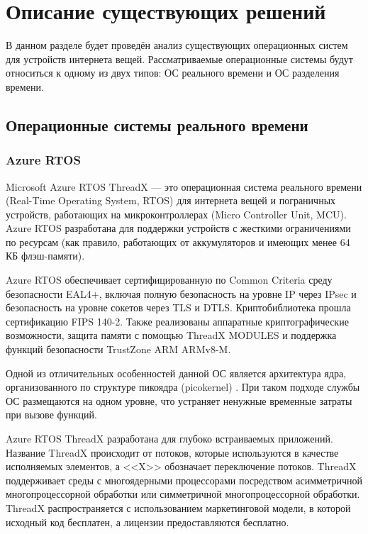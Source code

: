 \section{Описание существующих решений}

В данном разделе будет проведён анализ существующих операционных систем для устройств интернета вещей. Рассматриваемые операционные системы будут относиться к одному из двух типов: ОС реального времени и ОС разделения времени.

\subsection{Операционные системы реального времени}

\subsubsection{Azure RTOS}

Microsoft Azure RTOS ThreadX \cite{Azure_RTOS_overview} --- это операционная система реального времени (Real-Time Operating System, RTOS) для интернета вещей и пограничных устройств, работающих на микроконтроллерах (Micro Controller Unit, MCU). Azure RTOS разработана для поддержки устройств с жесткими ограничениями по ресурсам (как правило, работающих от аккумуляторов и имеющих менее 64 КБ флэш-памяти).

Azure RTOS обеспечивает сертифицированную по Common Criteria среду безопасности EAL4+, включая полную безопасность на уровне IP через IPsec и безопасность на уровне сокетов через TLS и DTLS. Криптобиблиотека прошла сертификацию FIPS 140-2. Также реализованы аппаратные криптографические возможности, защита памяти с помощью ThreadX MODULES и поддержка функций безопасности TrustZone ARM ARMv8-M.

Одной из отличительных особенностей данной ОС является архитектура ядра, организованного по структуре пикоядра (picokernel) \cite{Azure_RTOS_picokernel}. При таком подходе службы ОС размещаются на одном уровне, что устраняет ненужные временные затраты при вызове функций.

Azure RTOS ThreadX разработана для глубоко встраиваемых приложений. Название ThreadX происходит от потоков, которые используются в качестве исполняемых элементов, а <<X>> обозначает переключение потоков. ThreadX поддерживает среды с многоядерными процессорами посредством асимметричной многопроцессорной обработки или симметричной многопроцессорной обработки. ThreadX распространяется с использованием маркетинговой модели, в которой исходный код бесплатен, а лицензии предоставляются бесплатно.

